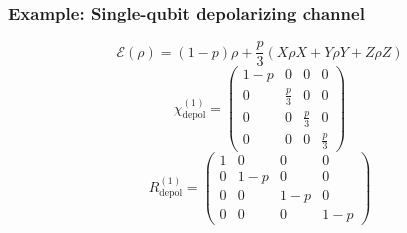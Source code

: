 \documentclass{article}
\begin{document}
\subsubsection*{Example: Single-qubit depolarizing channel}
\begin{equation}
    \mathcal{E}(\rho) = (1-p)\rho + \frac{p}{3}(X\rho X + Y\rho Y + Z\rho Z)
\end{equation}
\begin{equation}
    \chi_\text{depol}^{(1)} =
        \begin{pmatrix}
        1-p & 0 & 0 & 0\\
        0 & \frac{p}{3} & 0 & 0\\
        0 & 0 & \frac{p}{3} & 0\\
        0 & 0 & 0 & \frac{p}{3}
        \end{pmatrix}
\end{equation}
\begin{equation}
    R_\text{depol}^{(1)} =
        \begin{pmatrix}
        1 & 0 & 0 & 0\\
        0 & 1-p & 0 & 0\\
        0 & 0 & 1-p & 0\\
        0 & 0 & 0 & 1-p
        \end{pmatrix}
\end{equation}
\end{document}
